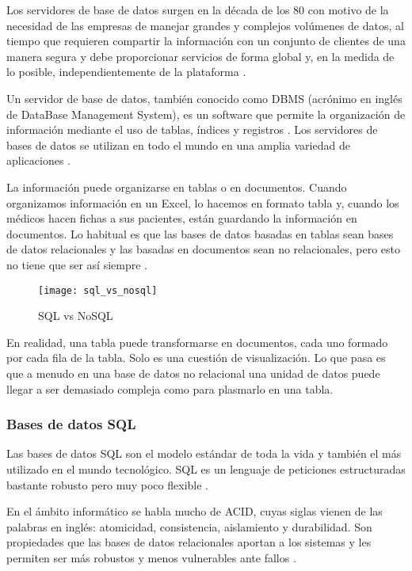 Los servidores de base de datos surgen en la década de los 80 con motivo de la necesidad de las empresas de manejar grandes y complejos volúmenes de datos, al tiempo que requieren compartir la información con un conjunto de clientes de una manera segura y debe proporcionar servicios de forma global y, en la medida de lo posible, independientemente de la plataforma \cite{bd2}.

Un servidor de base de datos, también conocido como DBMS (acrónimo en inglés de DataBase Management System), es un software que permite la organización de información mediante el uso de tablas, índices y registros \cite{bd9}. Los servidores de bases de datos se utilizan en todo el mundo en una amplia variedad de aplicaciones \cite{bd2}.

La información puede organizarse en tablas o en documentos. Cuando organizamos información en un Excel, lo hacemos en formato tabla y, cuando los médicos hacen fichas a sus pacientes, están guardando la información en documentos. Lo habitual es que las bases de datos basadas en tablas sean bases de datos relacionales y las basadas en documentos sean no relacionales, pero esto no tiene que ser así siempre \cite{bd3}.

\begin{figure}[htp!]
  \centering
  \texttt{[image: sql\_vs\_nosql]}
  \caption{SQL vs NoSQL}
  \label{fig:sql_vs_nosql}
\end{figure}

En realidad, una tabla puede transformarse en documentos, cada uno formado por cada fila de la tabla. Solo es una cuestión de visualización. Lo que pasa es que a menudo en una base de datos no relacional una unidad de datos puede llegar a ser demasiado compleja como para plasmarlo en una tabla.

\subsubsection{Bases de datos SQL}

Las bases de datos SQL son el modelo estándar de toda la vida y también el más utilizado en el mundo tecnológico. SQL es un lenguaje de peticiones estructuradas bastante robusto pero muy poco flexible \cite{bd4}.

En el ámbito informático se habla mucho de ACID, cuyas siglas vienen de las palabras en inglés: atomicidad, consistencia, aislamiento y durabilidad. Son propiedades que las bases de datos relacionales aportan a los sistemas y les permiten ser más robustos y menos vulnerables ante fallos \cite{bd3}.

